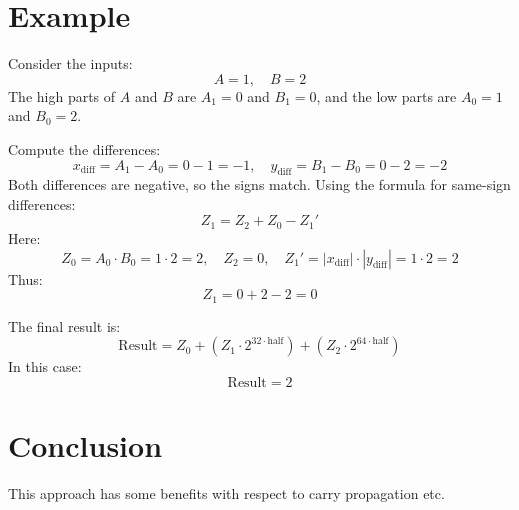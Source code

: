 \documentclass[12pt]{article}
\begin{document}
\section*{Example}
Consider the inputs:
\[
A = 1, \quad B = 2
\]
The high parts of \( A \) and \( B \) are \( A_1 = 0 \) and \( B_1 = 0 \), and the low parts are \( A_0 = 1 \) and \( B_0 = 2 \).

Compute the differences:
\[
x_{\text{diff}} = A_1 - A_0 = 0 - 1 = -1, \quad y_{\text{diff}} = B_1 - B_0 = 0 - 2 = -2
\]
Both differences are negative, so the signs match. Using the formula for same-sign differences:
\[
Z_1 = Z_2 + Z_0 - Z_1'
\]
Here:
\[
Z_0 = A_0 \cdot B_0 = 1 \cdot 2 = 2, \quad Z_2 = 0, \quad Z_1' = |x_{\text{diff}}| \cdot |y_{\text{diff}}| = 1 \cdot 2 = 2
\]
Thus:
\[
Z_1 = 0 + 2 - 2 = 0
\]

The final result is:
\[
\text{Result} = Z_0 + (Z_1 \cdot 2^{32 \cdot \text{half}}) + (Z_2 \cdot 2^{64 \cdot \text{half}})
\]
In this case:
\[
\text{Result} = 2
\]

\section*{Conclusion}
This approach has some benefits with respect to carry propagation etc.
\end{document}
